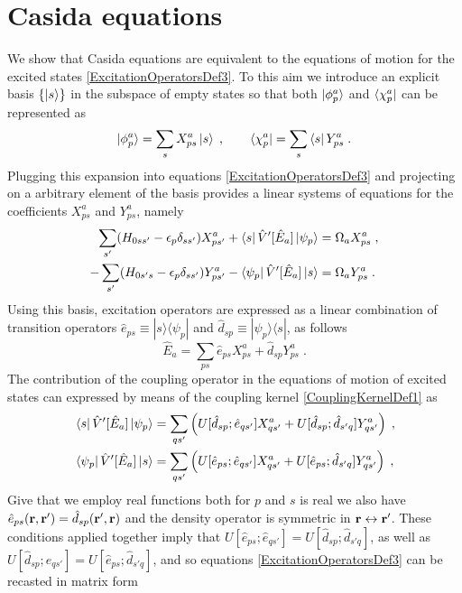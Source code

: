 \documentclass[reprint,aps,prb]{revtex4-1}
\renewcommand{\r}{{\bf r}}
\newcommand{\eps}{\epsilon}
\newcommand{\be}{\begin{equation}}
\newcommand{\ee}{\end{equation}}
\newcommand{\nn}{\notag}
\newcommand{\qq}{\qquad}
\newcommand{\lb}{\label}
\newcommand{\op}[1]{\hat {#1}}
\newcommand{\ketbra}[2]{| #1 \rangle \langle #2 |}
\newcommand{\excite}[2]{\op e_{{#1}{#2}}}
\newcommand{\decay}[2]{\op d_{{#1}{#2}}}
\begin{document}
\section{Casida equations}
\label{casida}

We show that Casida equations are equivalent to the equations of motion for the excited states \eqref{ExcitationOperatorsDef3}. To this aim we introduce an explicit basis $\{\ket{s}\}$
in the subspace of empty states so that both $\ket{\phi^a_p}$ and $\bra{\chi^a_p}$ can be represented as
\be
\ket{\phi^a_p} = \sum_s X^a_{p s}\ket{s} \;, \qq
\bra{\chi^a_p} = \sum_s\bra{s}Y^a_{p s} \;. \lb{phiandchi}
\ee
Plugging this expansion into equations \eqref{ExcitationOperatorsDef3} and projecting on a arbitrary element of the basis provides a linear systems of equations for the coefficients
$X^a_{ps}$ and $Y^a_{ps}$, namely
\begin{align}
 \sum_{s'}(H_{0ss'}-\eps_p\delta_{ss'})X^a_{ps'} + \bra{s}\op V'[\op E_a]\ket{\psi_p} &= \Omega_a X^a_{ps} \;, \nn \\
 -\sum_{s'} (H_{0 s' s}-\eps_p\delta_{s s'})Y^a_{ps'} - \bra{\psi_p}\op V'[\op E_a]\ket{s}& = \Omega_a Y^a_{ps} \;. \nn
\end{align}
Using this basis, excitation operators are expressed as a linear combination of transition operators $\excite{p}{s} \equiv \ketbra{s}{\psi_p}$ and $\decay{s}{p} \equiv \ketbra{\psi_p}{s}$,
as follows
\be\lb{ExcitationOpBasisTransition1}
\op E_a = \sum_{ps}\excite{p}{s}X^a_{ps}+\decay{s}{p}Y^a_{ps} \;.
\ee
The contribution of the coupling operator in the equations of motion of excited states can expressed by means of the coupling kernel \eqref{CouplingKernelDef1} as
\begin{align}
& \bra{s}\op V'[\op E_a]\ket{\psi_p} = \sum_{qs'}\left(U[\decay{s}{p};\excite{q}{s'}]X^a_{qs'} + U[\decay{s}{p};\decay{s'}{q}]Y^a_{qs'}\right) \;,\nn \\
& \bra{\psi_p}\op V'[\op E_a]\ket{s} = \sum_{qs'}\left(U[\excite{p}{s};\excite{q}{s'}]X^a_{qs'} + U[\excite{p}{s};\decay{s'}{q}]Y^a_{qs'}\right) \;, \nn
\end{align}
Give that we employ real functions both for $p$ and $s$ is real we also have $\excite{p}{s}(\r,\r') = \decay{s}{p}(\r',\r)$ and the density operator is symmetric in $\r \leftrightarrow \r'$.
These conditions applied together imply that $U[\excite{p}{s};\excite{q}{s'}] = U[\decay{s}{p};\decay{s'}{q}]$, as well as $U[\decay{s}{p};\excite{q}{s'}] = U[\excite{p}{s};\decay{s'}{q}]$,
and so equations \eqref{ExcitationOperatorsDef3} can be recasted in matrix form
\end{document}
